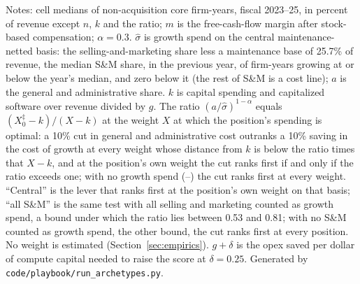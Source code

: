 \begin{table}[t]
\smallskip
\begin{minipage}{0.98\linewidth}\scriptsize
Notes: cell medians of non-acquisition core firm-years, fiscal 2023--25, in percent of revenue except $n$, $k$ and the ratio; $m$ is the free-cash-flow margin after stock-based compensation; $\alpha=0.3$. $\hat\sigma$ is growth spend on the central maintenance-netted basis: the selling-and-marketing share less a maintenance base of 25.7\% of revenue, the median S\&M share, in the previous year, of firm-years growing at or below the year's median, and zero below it (the rest of S\&M is a cost line); $a$ is the general and administrative share. $k$ is capital spending and capitalized software over revenue divided by $g$. The ratio $(a/\hat\sigma)^{1-\alpha}$ equals $(X^\ddagger_0-k)/(X-k)$ at the weight $X$ at which the position's spending is optimal: a 10\% cut in general and administrative cost outranks a 10\% saving in the cost of growth at every weight whose distance from $k$ is below the ratio times that $X-k$, and at the position's own weight the cut ranks first if and only if the ratio exceeds one; with no growth spend (--) the cut ranks first at every weight. ``Central'' is the lever that ranks first at the position's own weight on that basis; ``all S\&M'' is the same test with all selling and marketing counted as growth spend, a bound under which the ratio lies between 0.53 and 0.81; with no S\&M counted as growth spend, the other bound, the cut ranks first at every position. No weight is estimated (Section~\ref{sec:empirics}). $g+\delta$ is the opex saved per dollar of compute capital needed to raise the score at $\delta=0.25$. Generated by \texttt{code/playbook/run\_archetypes.py}.
\end{minipage}
\end{table}
